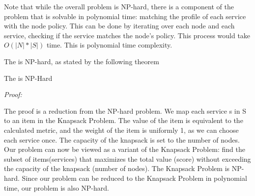 \begin{problem}

\end{problem}

Note that while the overall problem is NP-hard, there is a component of the problem that is solvable in polynomial time: matching the profile of each service with the node policy.
This can be done by iterating over each node and each service, checking if the service matches the node’s policy.
This process would take $O(|N|*|S|)$ time. This is polynomial time complexity.

The \problem is NP-hard, as stated by the following theorem
\begin{theorem}
  The \problem is NP-Hard
\end{theorem}
\emph{Proof: }

The proof is a reduction from the NP-hard problem. We map each service s in S to an item in the Knapsack Problem.
The value of the item is equivalent to the calculated metric, and the weight of the item is uniformly 1, as we can choose each service once. The capacity of the knapsack is set to the number of nodes.
Our problem can now be viewed as a variant of the Knapsack Problem: find the subset of items(services)
that maximizes the total value (score) without exceeding the capacity of the knapsack (number of nodes).
The Knapsack Problem is NP-hard.
Since our problem can be reduced to the Knapsack Problem in polynomial time, our problem is also NP-hard.

\begin{example}
\end{example}


